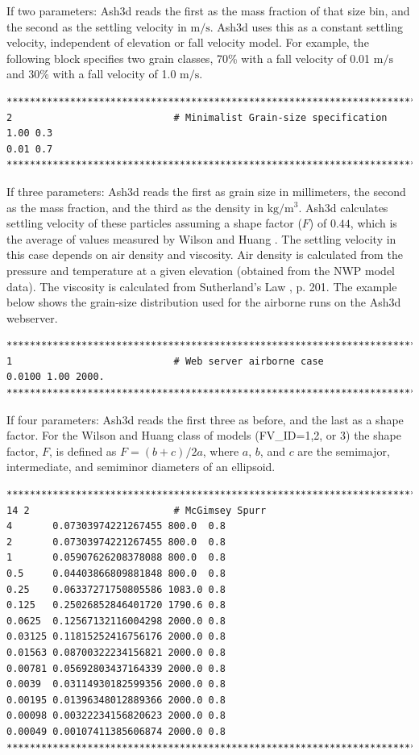 If two parameters: Ash3d reads the first as the mass fraction of that size bin, and
the second as the settling velocity in $\mathrm{m/s}$. Ash3d uses this as a constant settling
velocity, independent of elevation or fall velocity model. For example, the following block
specifies two grain classes, 70\% with a fall velocity of 0.01 $\mathrm{m/s}$ and 
30\% with a fall velocity of 1.0 $\mathrm{m/s}$.
\small
\begin{verbatim}
*******************************************************************************
2                            # Minimalist Grain-size specification
1.00 0.3
0.01 0.7
*******************************************************************************
\end{verbatim}
\normalsize
If three parameters: Ash3d reads the first as grain size in millimeters, the second
as the mass fraction, and the third as the density in $\mathrm{kg/m^3}$.
Ash3d calculates settling
velocity of these particles assuming a shape factor ($F$) of $0.44$, which is the average
of values measured by Wilson and Huang \cite{Wilson79}. The settling velocity in this case
depends on air density and viscosity. Air density is calculated from the pressure
and temperature at a
given elevation (obtained from the NWP model data). The viscosity is calculated from
Sutherland’s Law \cite{Jacobson05}, p. 201.  The example below shows the grain-size
distribution used for the airborne runs on the Ash3d webserver.
\small
\begin{verbatim}
*******************************************************************************
1                            # Web server airborne case
0.0100 1.00 2000.
*******************************************************************************
\end{verbatim}
\normalsize
If four parameters: Ash3d reads the first three as before, and the last as a
shape factor.  For the Wilson and Huang class of models (FV\_ID=1,2, or 3)
the shape factor, $F$, is defined as $F=(b+c)/2a$, where $a$, $b$, and $c$ are the
semimajor, intermediate, and semiminor diameters of an ellipsoid.
\small
\begin{verbatim}
*******************************************************************************
14 2                         # McGimsey Spurr
4       0.07303974221267455 800.0  0.8
2       0.07303974221267455 800.0  0.8
1       0.05907626208378088 800.0  0.8
0.5     0.04403866809881848 800.0  0.8
0.25    0.06337271750805586 1083.0 0.8
0.125   0.25026852846401720 1790.6 0.8
0.0625  0.12567132116004298 2000.0 0.8
0.03125 0.11815252416756176 2000.0 0.8
0.01563 0.08700322234156821 2000.0 0.8
0.00781 0.05692803437164339 2000.0 0.8
0.0039  0.03114930182599356 2000.0 0.8
0.00195 0.01396348012889366 2000.0 0.8
0.00098 0.00322234156820623 2000.0 0.8
0.00049 0.00107411385606874 2000.0 0.8
*******************************************************************************
\end{verbatim}
